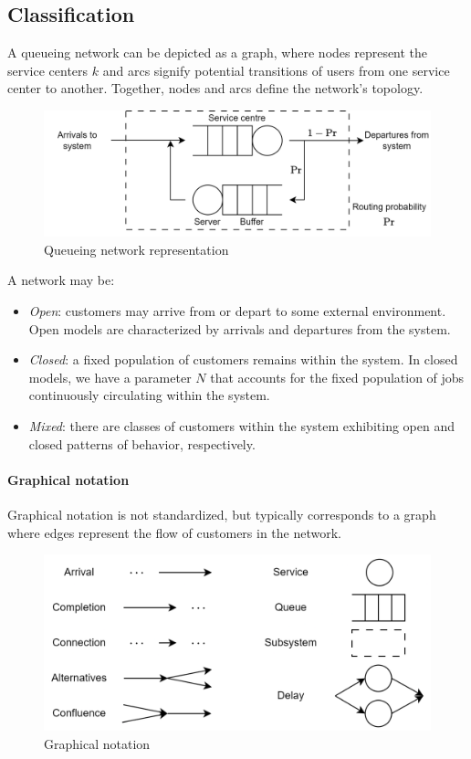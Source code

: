 \subsection{Classification}
A queueing network can be depicted as a graph, where nodes represent the service centers $k$ and arcs signify potential transitions of users from one service center to another.
Together, nodes and arcs define the network's topology.
\begin{figure}[H]
    \centering
    \includegraphics[width=0.65\linewidth]{images/per.png}
    \caption{Queueing network representation}
\end{figure}
A network may be:
\begin{itemize}
    \item \textit{Open}: customers may arrive from or depart to some external environment. 
        Open models are characterized by arrivals and departures from the system.
    \item \textit{Closed}: a fixed population of customers remains within the system. 
        In closed models, we have a parameter $N$ that accounts for the fixed population of jobs continuously circulating within the system.
    \item \textit{Mixed}: there are classes of customers within the system exhibiting open and closed patterns of behavior, respectively.
\end{itemize}

\paragraph*{Graphical notation}
Graphical notation is not standardized, but typically corresponds to a graph where edges represent the flow of customers in the network.
\begin{figure}[H]
    \centering
    \includegraphics[width=0.5\linewidth]{images/gra.png}
    \caption{Graphical notation}
\end{figure}